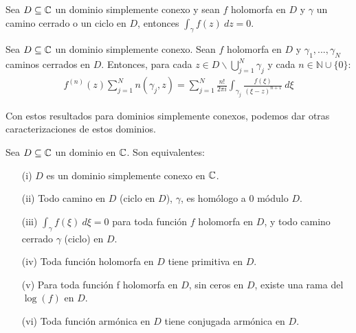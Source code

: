 \begin{teo}
    Sea $D \subseteq \mathbb{C}$ un dominio simplemente conexo y sean $f$ holomorfa en $D$ y $\gamma$ un camino cerrado o un ciclo en $D$, entonces $\int_{\gamma} f(z) \ dz = 0$.
\end{teo}

\begin{teo}
    Sea $D \subseteq \mathbb{C}$ un dominio simplemente conexo. Sean $f$ holomorfa en $D$ y $\gamma_1,...,\gamma_N$ caminos cerrados en $D$. Entonces, para cada $z \in D \backslash \bigcup_{j=1}^{N} \gamma_j$ y cada $n \in \mathbb{N} \cup \{0\}$:
    \begin{align*}
        f^{(n)}(z) \sum_{j=1}^{N} n(\gamma_j,z) = \sum_{j=1}^{N} \frac{n!}{2\pi i} \int_{\gamma_j} \frac{f(\xi)}{(\xi -z)^{n+1}} \ d\xi
    \end{align*}
\end{teo}

Con estos resultados para dominios simplemente conexos, podemos dar otras caracterizaciones de estos dominios.

\begin{teo}
    Sea $D \subseteq \mathbb{C}$ un dominio en $\mathbb{C}$. Son equivalentes:
    \begin{enumerate}
        \item[(i)] $D$ es un dominio simplemente conexo en $\mathbb{C}$.
        \item[(ii)] Todo camino en $D$ (ciclo en $D$), $\gamma$, es homólogo a 0 módulo $D$.
        \item[(iii)] $\int_{\gamma} f(\xi) \ d\xi = 0$ para toda función $f$ holomorfa en $D$, y todo camino cerrado $\gamma$ (ciclo) en $D$.
        \item[(iv)] Toda función holomorfa en $D$ tiene primitiva en $D$.
        \item[(v)] Para toda función f holomorfa en $D$, sin ceros en $D$, existe una rama del $\log(f)$ en $D$.
        \item[(vi)] Toda función armónica en $D$ tiene conjugada armónica en $D$.
    \end{enumerate}
\end{teo}

